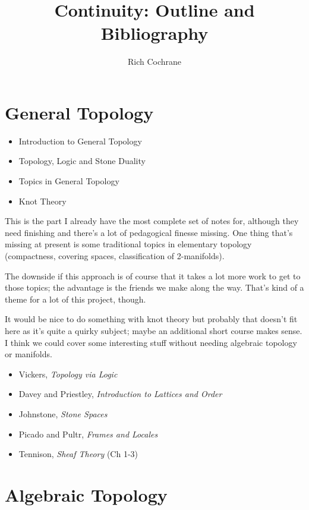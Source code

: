 \documentclass[article]{article}
\begin{document}
\title{Continuity: Outline and Bibliography}
\author{Rich Cochrane}
\maketitle

\section{General Topology}

\begin{itemize}
	\item{Introduction to General Topology}
	\item{Topology, Logic and Stone Duality}
	\item{Topics in General Topology}
	\item{Knot Theory}
\end{itemize}
This is the part I already have the most complete set of notes for, although they need finishing and there's a lot of pedagogical finesse missing. One thing that's missing at present is some traditional topics in elementary topology (compactness, covering spaces, classification of 2-manifolds). 

The downside if this approach is of course that it takes a lot more work to get to those topics; the advantage is the friends we make along the way. That's kind of a theme for a lot of this project, though.

It would be nice to do something with knot theory but probably that doesn't fit here as it's quite a quirky subject; maybe an additional short course makes sense. I think we could cover some interesting stuff without needing algebraic topology or manifolds.

\begin{itemize}
	\item[]{Vickers, \emph{Topology via Logic}}
	\item[]{Davey and Priestley, \textit{Introduction to Lattices and Order}}
	\item[]{Johnstone, \emph{Stone Spaces}}
	\item[]{Picado and Pultr, \emph{Frames and Locales}}
	\item[]{Tennison, \emph{Sheaf Theory} (Ch 1-3)}
\end{itemize}

\section{Algebraic Topology}
\end{document}
